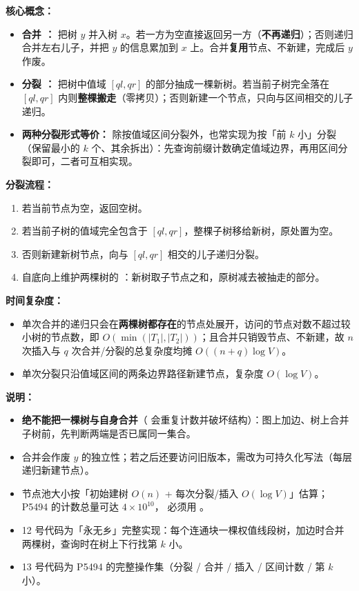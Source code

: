 \textbf{核心概念：}
\begin{itemize}
  \item \textbf{合并 ：} 把树 $y$ 并入树 $x$。若一方为空直接返回另一方（\textbf{不再递归}）；否则递归合并左右儿子，并把 $y$ 的信息累加到 $x$ 上。合并\textbf{复用}节点、不新建，完成后 $y$ 作废。
  \item \textbf{分裂 ：} 把树中值域 $[ql, qr]$ 的部分抽成一棵新树。若当前子树完全落在 $[ql, qr]$ 内则\textbf{整棵搬走}（零拷贝）；否则新建一个节点，只向与区间相交的儿子递归。
  \item \textbf{两种分裂形式等价：} 除按值域区间分裂外，也常实现为按「前 $k$ 小」分裂（保留最小的 $k$ 个、其余拆出）：先查询前缀计数确定值域边界，再用区间分裂即可，二者可互相实现。
\end{itemize}

\textbf{分裂流程：}
\begin{enumerate}
  \item 若当前节点为空，返回空树。
  \item 若当前子树的值域完全包含于 $[ql, qr]$，整棵子树移给新树，原处置为空。
  \item 否则新建新树节点，向与 $[ql, qr]$ 相交的儿子递归分裂。
  \item 自底向上维护两棵树的 ：新树取子节点之和，原树减去被抽走的部分。
\end{enumerate}

\textbf{时间复杂度：}
\begin{itemize}
  \item 单次合并的递归只会在\textbf{两棵树都存在}的节点处展开，访问的节点对数不超过较小树的节点数，即 $O(\min(|T_1|, |T_2|))$；且合并只销毁节点、不新建，故 $n$ 次插入与 $q$ 次合并/分裂的总复杂度均摊 $O((n + q) \log V)$。
  \item 单次分裂只沿值域区间的两条边界路径新建节点，复杂度 $O(\log V)$。
\end{itemize}





\textbf{说明：}
\begin{itemize}
  \item \textbf{绝不能把一棵树与自身合并}（ 会重复计数并破坏结构）：图上加边、树上合并子树前，先判断两端是否已属同一集合。
  \item 合并会作废 $y$ 的独立性；若之后还要访问旧版本，需改为可持久化写法（每层递归新建节点）。
  \item 节点池大小按「初始建树 $O(n)$ + 每次分裂/插入 $O(\log V)$」估算；P5494 的计数总量可达 $4 \times 10^{10}$， 必须用 。
  \item 12 号代码为「永无乡」完整实现：每个连通块一棵权值线段树，加边时合并两棵树，查询时在树上下行找第 $k$ 小。
  \item 13 号代码为 P5494 的完整操作集（分裂 / 合并 / 插入 / 区间计数 / 第 $k$ 小）。
\end{itemize}

